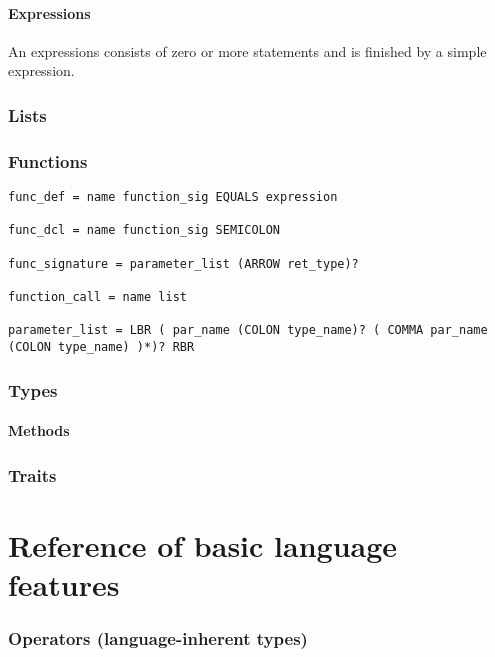 \documentclass{scrartcl}
\begin{document}
\subsection{Expressions}
An expressions consists of zero or more statements and is finished by a simple expression.

\section{Lists}

\section{Functions}
\begin{lstlisting}
func_def = name function_sig EQUALS expression

func_dcl = name function_sig SEMICOLON

func_signature = parameter_list (ARROW ret_type)?

function_call = name list

parameter_list = LBR ( par_name (COLON type_name)? ( COMMA par_name (COLON type_name) )*)? RBR
\end{lstlisting}


\section{Types}

\subsection{Methods}

\section{Traits}





\part{Reference of basic language features}

\section{Operators (language-inherent types)}

\end{document}
